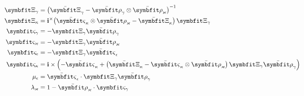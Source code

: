 \iftrue
\begin{subequations}
\begin{align}
\ShiftB &=\left(\TraceFF-\TraceFT\otimes\TraceTF\right)^{-1} \\
\ShiftA &=\FrameBasis^\times\bigl(\TraceBT\otimes\TraceTF - \TraceMF\bigr)\,\ShiftB \\
\ShiftK &=-\ShiftB\TraceFT \\
\ShiftT &=-\ShiftB\TraceTF \\
\ShiftN &=- \ShiftB\TraceNF \\
\ShiftF&=\FrameBasis\times\Bigl(
-\TraceBT+\bigl(\TraceMF - \TraceBT\otimes\TraceTF\bigr)\,\ShiftB\TraceFT
\Bigr)\\
\ShiftScaleN&=\TraceNF\cdot\ShiftB\TraceFT \\
\ShiftScaleT &=1 - \TraceTF\cdot\ShiftK
\end{align}
\label{eq:Tinv-from-T}
\end{subequations}
\fi 


